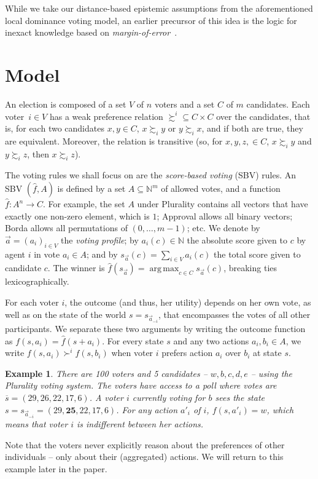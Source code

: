 \documentclass[letterpaper]{article} %
\DeclareMathOperator*{\argmax}{arg\,max}
\def\ol{\overline}
\newtheorem{example}[theorem]{Example}
\begin{document}
While we take our distance-based epistemic assumptions from the aforementioned local dominance voting model, an earlier precursor of this idea is the logic for inexact knowledge based on \emph{margin-of-error}~\cite{williamson1992inexact}.


\section{Model}\label{sec:model}

An election is composed of a set $V$ of $n$ voters and a set $C$ of $m$ candidates. Each voter~$i\in V$ has a weak preference relation $\succsim^{i}\subseteq C\times C$ over the candidates, that is, for each two candidates $x,y\in C$, $x\succsim_{i}y$ or $y\succsim_{i}x$, and if both are true, they are equivalent. Moreover, the relation is transitive (so, for $x,y,z,\in C$, $x\succsim_{i}y$ and $y\succsim_{i}z$, then $x\succsim_{i}z$).

The voting rules we shall focus on are the \emph{score-based voting} (SBV) rules. An SBV $(\hat f,A)$ is defined by a set $A\subseteq \mathbb N^m$ of allowed votes, and a function $\hat f:A^{n}\rightarrow C$. For example, the set $A$ under Plurality contains all vectors that have exactly one non-zero element, which is $1$; Approval allows all binary vectors; Borda allows all permutations of $(0,\ldots,m-1)$; etc. We denote by $\vec a = (a_i)_{i\in V}$ the \emph{voting profile}; by $a_i(c)\in \mathbb N$ the absolute score given to $c$ by agent $i$ in vote $a_i\in A$; and by $s_{\vec a}(c)=\sum_{i\in V}a_i(c)$ the total score given to candidate $c$. The winner is $\hat f(s_{\vec a})=\argmax_{c\in C}s_{\vec a}(c)$, breaking ties lexicographically.

For each voter $i$, the outcome (and thus, her utility) depends on her own vote, as well as on the state of the world $s=s_{\vec a_{-i}}$, that encompasses the votes of all other participants. We separate these two arguments by writing the outcome function as $f(s,a_i) = \hat f(s+a_i)$. For every state $s$ and any two actions $a_i,b_i\in A$, we write $f(s,a_i) \succ^i f(s,b_i)$ when voter $i$ prefers action $a_i$ over $b_i$ at state $s$.

\begin{example}\label{ex:simple}
There are 100 voters and 5 candidates -- $w,b,c,d,e$ -- using the Plurality voting system. The voters have access to a poll where votes are $\ol s = (29,26,22,17,6)$.
 A voter $i$ currently voting for $b$ sees the state $s=s_{\vec a_{-i}} =(29,\mathbf{25},22,17,6)$. For any action $a'_i$ of $i$, $f(s,a'_i)= w$, which means that voter $i$ is indifferent between her actions.
\end{example}
 Note that the voters never explicitly reason about the preferences of other individuals -- only about their (aggregated) actions.
 We will return to this example later in the paper.
\end{document}
